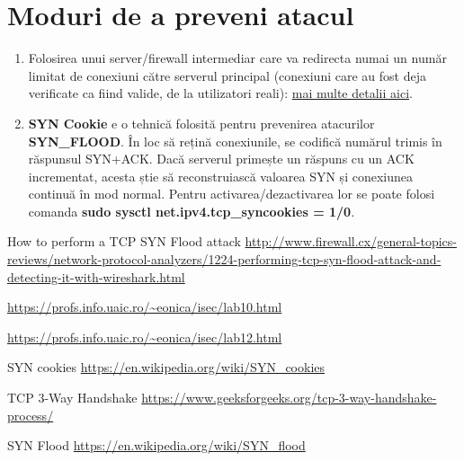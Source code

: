 \documentclass[a4paper]{article}
\begin{document}
\section{Moduri de a preveni atacul}

\begin{enumerate}
    \item Folosirea unui server/firewall intermediar care va redirecta numai un număr limitat de conexiuni către serverul principal (conexiuni care au fost deja verificate ca fiind valide, de la utilizatori reali): \href{https://www.youtube.com/watch?v=nYPFH1ZAlck&ab_channel=CBTNuggets}{mai multe detalii aici}.

    \item \textbf{SYN Cookie} e o tehnică folosită pentru prevenirea atacurilor \textbf{SYN\_FLOOD}. În loc să rețină conexiunile, se codifică numărul trimis în răspunsul SYN+ACK. Dacă serverul primește un răspuns cu un ACK incrementat, acesta știe să reconstruiască valoarea SYN și conexiunea continuă în mod normal. Pentru activarea/dezactivarea lor se poate folosi comanda \textbf{sudo sysctl net.ipv4.tcp\_syncookies = 1/0}.
    
\end{enumerate}

\begin{thebibliography}{9}
		
	    How to perform a TCP SYN Flood attack
	    \url{http://www.firewall.cx/general-topics-reviews/network-protocol-analyzers/1224-performing-tcp-syn-flood-attack-and-detecting-it-with-wireshark.html}

        \url{https://profs.info.uaic.ro/~eonica/isec/lab10.html}
    
        \url{https://profs.info.uaic.ro/~eonica/isec/lab12.html}

        SYN cookies
        \url{https://en.wikipedia.org/wiki/SYN_cookies}

        TCP 3-Way Handshake
        \url{https://www.geeksforgeeks.org/tcp-3-way-handshake-process/}

        SYN Flood
        \url{https://en.wikipedia.org/wiki/SYN_flood}

\end{thebibliography}
\end{document}
